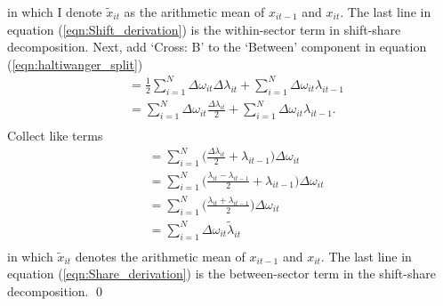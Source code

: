in which I denote $\tilde{x}_{it}$ as the arithmetic mean of $x_{it-1}$ and $x_{it}$. The last line in equation (\ref{eqn:Shift_derivation}) is the within-sector term in shift-share decomposition. Next, add `Cross: B' to the `Between' component in equation (\ref{eqn:haltiwanger_split})
\begin{equation*}
\begin{split}
    &= \frac{1}{2}\sum_{i=1}^{N}\Delta\omega_{it}\Delta\lambda_{it} + \sum_{i=1}^{N}\Delta\omega_{it}\lambda_{it-1} \\
    &= \sum_{i=1}^{N}\Delta\omega_{it}\frac{\Delta\lambda_{it}}{2} + \sum_{i=1}^{N}\Delta\omega_{it}\lambda_{it-1}. \\
\end{split}
\end{equation*}
Collect like terms
\begin{equation}
\begin{split}
    &= \sum_{i=1}^{N}\bigg(\frac{\Delta\lambda_{it}}{2} + \lambda_{it-1}\bigg)\Delta\omega_{it} \\
    &= \sum_{i=1}^{N}\bigg(\frac{\lambda_{it} - \lambda_{it-1}}{2} + \lambda_{it-1}\bigg)\Delta\omega_{it} \\
    &= \sum_{i=1}^{N}\bigg(\frac{\lambda_{it} + \lambda_{it-1}}{2}\bigg)\Delta\omega_{it} \\
    &= \sum_{i=1}^{N}\Delta\omega_{it}\tilde{\lambda}_{it} \\
\end{split}
\label{eqn:Share_derivation}
\end{equation}
in which $\tilde{x}_{it}$ denotes the arithmetic mean of $x_{it-1}$ and $x_{it}$. The last line in equation (\ref{eqn:Share_derivation}) is the between-sector term in the shift-share decomposition. \qed
